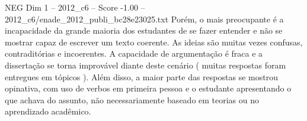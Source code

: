 \begin{textsample}{NEG Dim 1 – 2012\_c6 – Score -1.00 – 2012\_c6/enade\_2012\_publi\_bc28e23025.txt}
Porém, o mais preocupante é a incapacidade da grande maioria dos estudantes de se fazer entender e não se mostrar capaz de escrever um texto coerente.
As ideias são muitas vezes confusas, contraditórias e incoerentes.
A capacidade de argumentação é fraca e a dissertação se torna improvável diante deste cenário ( muitas respostas foram entregues em tópicos ).
Além disso, a maior parte das respostas se mostrou opinativa, com uso de verbos em primeira pessoa e o estudante apresentando o que achava do assunto, não necessariamente baseado em teorias ou no aprendizado acadêmico.

\end{textsample}

